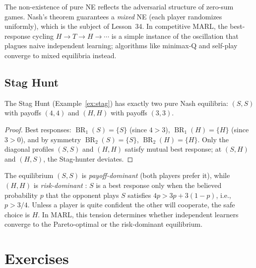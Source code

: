 \documentclass[11pt,a4paper]{article}
\DeclareMathOperator{\BR}{BR}
\begin{document}
\begin{remark}
\label{rem:mp_mixed}
The non-existence of pure NE reflects the adversarial structure of zero-sum
games.  Nash's theorem \citep{nash1950} guarantees a \emph{mixed} NE (each
player randomizes uniformly), which is the subject of Lesson~34.  In
competitive MARL, the best-response cycling $H \to T \to H \to \cdots$ is
a simple instance of the oscillation that plagues naive independent learning;
algorithms like minimax-Q and self-play converge to mixed equilibria instead.
\end{remark}

\subsection{Stag Hunt}
\label{subsec:stag_analysis}

\begin{proposition}
\label{prop:stag_ne}
The Stag Hunt (Example~\ref{ex:stag}) has exactly two pure Nash equilibria:
$(S, S)$ with payoffs $(4, 4)$ and $(H, H)$ with payoffs $(3, 3)$.
\end{proposition}

\begin{proof}
Best responses: $\BR_1(S) = \{S\}$ (since $4 > 3$), $\BR_1(H) = \{H\}$
(since $3 > 0$), and by symmetry $\BR_2(S) = \{S\}$, $\BR_2(H) = \{H\}$.
Only the diagonal profiles $(S,S)$ and $(H,H)$ satisfy mutual best response;
at $(S,H)$ and $(H,S)$, the Stag-hunter deviates.
\end{proof}

\begin{remark}
\label{rem:stag_selection}
The equilibrium $(S,S)$ is \emph{payoff-dominant} (both players prefer it),
while $(H,H)$ is \emph{risk-dominant} \citep{fudenberg1991}: $S$ is a best
response only when the believed probability $p$ that the opponent plays $S$
satisfies $4p > 3p + 3(1-p)$, i.e., $p > 3/4$.  Unless a player is quite
confident the other will cooperate, the safe choice is $H$.  In MARL, this
tension determines whether independent learners converge to the
Pareto-optimal or the risk-dominant equilibrium.
\end{remark}


\section{Exercises}
\label{sec:exercises}
\end{document}
